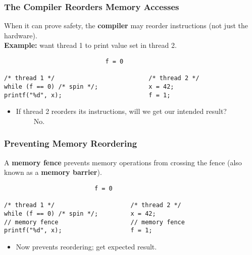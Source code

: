 \begin{frame}[fragile]
  \frametitle{The Compiler Reorders Memory Accesses}

  
  When it can prove safety, the {\bf compiler} may reorder instructions (not just the hardware).\\[1em]

  {\bf Example:} want thread 1 to print value set in thread 2.

  \begin{lstlisting}
                            f = 0

/* thread 1 */                          /* thread 2 */
while (f == 0) /* spin */;              x = 42;
printf("%d", x);                        f = 1;
  \end{lstlisting}

  \begin{itemize}
    \item If thread 2 reorders its instructions, will we get our intended
      result?\\[1em]
     \alert{~~~~~No.}
  \end{itemize}
  
\end{frame}

\begin{frame}[fragile]
  \frametitle{Preventing Memory Reordering}

  
     A {\bf memory fence} prevents memory operations from crossing the
      fence (also known as a {\bf memory barrier}).

  \begin{lstlisting}
                         f = 0

/* thread 1 */                     /* thread 2 */
while (f == 0) /* spin */;         x = 42;
// memory fence                    // memory fence
printf("%d", x);                   f = 1;
  \end{lstlisting}

  \begin{itemize}
    \item Now prevents reordering; get expected result.
  \end{itemize}
  

\end{frame}

